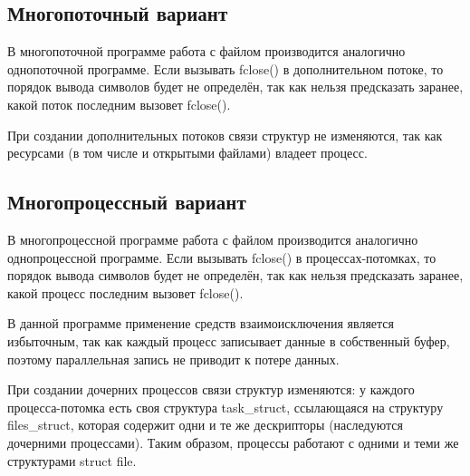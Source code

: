 \documentclass[a4paper,14pt]{extarticle}
\begin{document}
\subsection{Многопоточный вариант}







В многопоточной программе работа с файлом производится аналогично однопоточной программе. Если вызывать fclose() в дополнительном потоке, то порядок вывода символов будет не определён, так как нельзя предсказать заранее, какой поток последним вызовет fclose().

При создании дополнительных потоков связи структур не изменяются, так как ресурсами (в том числе и открытыми файлами) владеет процесс.

\subsection{Многопроцессный вариант}







В многопроцессной программе работа с файлом производится аналогично однопроцессной программе. Если вызывать fclose() в процессах-потомках, то порядок вывода символов будет не определён, так как нельзя предсказать заранее, какой процесс последним вызовет fclose().

В данной программе применение средств взаимоисключения является избыточным, так как каждый процесс записывает данные в собственный буфер, поэтому параллельная запись не приводит к потере данных.

При создании дочерних процессов связи структур изменяются: у каждого процесса-потомка есть своя структура task\_struct, ссылающаяся на структуру files\_struct, которая содержит одни и те же дескрипторы (наследуются дочерними процессами). Таким образом, процессы работают с одними и теми же структурами struct file.
\end{document}
